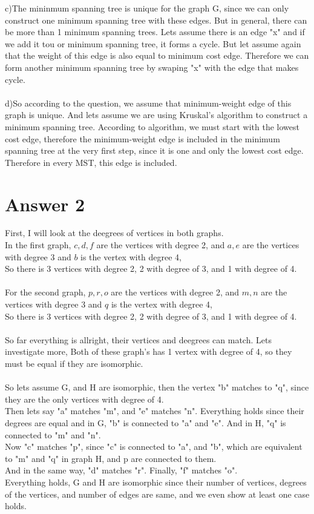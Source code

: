 \documentclass[12pt]{article}
\begin{document}
c)The mininmum spanning tree is unique for the graph G, since we can only construct one minimum spanning tree with these edges. But in general, there can be more than 1 minimum spanning trees. Lets assume there is an edge "x" and if we add it tou or minimum spanning tree, it forms a cycle. But let assume again that the weight of this edge is also equal to minimum cost edge. Therefore we can form another minimum spanning tree by swaping "x" with the edge that makes cycle.
\\\\
d)So according to the question, we assume that minimum-weight edge of this graph is unique. And lets assume we are using Kruskal's algorithm to construct a minimum spanning tree. According to algorithm, we must start with the lowest cost edge, therefore the minimum-weight edge is included in the minimum spanning tree at the very first step, since it is one and only the lowest cost edge. Therefore in every MST, this edge is included.
\section*{Answer 2}
    First, I will look at the deegrees of vertices in both graphs.\\
    In the first graph, ${c,d,f}$ are the vertices with degree 2, and ${a,e}$ are the vertices with degree 3 and ${b}$ is the vertex with degree 4,\\
    So there is 3 vertices with degree 2, 2 with degree of 3, and 1 with degree of 4.\\\\
    For the second graph, ${p,r,o}$ are the vertices with degree 2, and ${m,n}$ are the vertices with degree 3 and ${q}$ is the vertex with degree 4,\\
    So there is 3 vertices with degree 2, 2 with degree of 3, and 1 with degree of 4.\\\\ So far everything is allright, their vertices and deegrees can match. Lets investigate more, Both of these graph's has 1 vertex with degree of 4, so they must be equal if they are isomorphic. \\\\
    So lets assume G, and H are isomorphic, then the vertex "b" matches to "q", since they are the only vertices with degree of 4.\\Then lets say "a" matches "m", and "e" matches "n". Everything holds since their degrees are equal and in G, "b" is connected to "a" and "e". And in H, "q" is connected to "m" and "n". \\Now "c" matches "p", since "c" is connected to "a", and "b", which are equivalent to "m" and "q" in graph H, and p are connected to them.\\And in the same way, "d" matches "r". Finally, "f" matches "o".\\
    Everything holds, G and H are isomorphic since their number of vertices, degrees of the vertices, and number of edges are same, and we even show at least one case holds.
\end{document}
